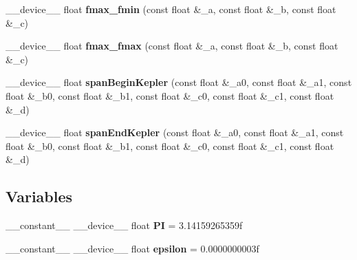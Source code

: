 \begin{DoxyCompactItemize}
\item 
\hypertarget{MathHelpers_8cuh_aaf48f2af61e0c6b973de0d961acd16b0}{\-\_\-\-\_\-device\-\_\-\-\_\- float {\bfseries fmax\-\_\-fmin} (const float \&\-\_\-a, const float \&\-\_\-b, const float \&\-\_\-c)}\label{MathHelpers_8cuh_aaf48f2af61e0c6b973de0d961acd16b0}

\item 
\hypertarget{MathHelpers_8cuh_a937b9ff47af7eb505a037fa86e1523a9}{\-\_\-\-\_\-device\-\_\-\-\_\- float {\bfseries fmax\-\_\-fmax} (const float \&\-\_\-a, const float \&\-\_\-b, const float \&\-\_\-c)}\label{MathHelpers_8cuh_a937b9ff47af7eb505a037fa86e1523a9}

\item 
\hypertarget{MathHelpers_8cuh_a17a7bff6cc0b6d64ab41e1fa53b976ee}{\-\_\-\-\_\-device\-\_\-\-\_\- float {\bfseries span\-Begin\-Kepler} (const float \&\-\_\-a0, const float \&\-\_\-a1, const float \&\-\_\-b0, const float \&\-\_\-b1, const float \&\-\_\-c0, const float \&\-\_\-c1, const float \&\-\_\-d)}\label{MathHelpers_8cuh_a17a7bff6cc0b6d64ab41e1fa53b976ee}

\item 
\hypertarget{MathHelpers_8cuh_a85b98f5676293e397b05185edbeb416e}{\-\_\-\-\_\-device\-\_\-\-\_\- float {\bfseries span\-End\-Kepler} (const float \&\-\_\-a0, const float \&\-\_\-a1, const float \&\-\_\-b0, const float \&\-\_\-b1, const float \&\-\_\-c0, const float \&\-\_\-c1, const float \&\-\_\-d)}\label{MathHelpers_8cuh_a85b98f5676293e397b05185edbeb416e}

\end{DoxyCompactItemize}
\subsection*{Variables}
\begin{DoxyCompactItemize}
\item 
\hypertarget{MathHelpers_8cuh_a6139c42f2db8c596bda238a11dbbc8d8}{\-\_\-\-\_\-constant\-\_\-\-\_\- \-\_\-\-\_\-device\-\_\-\-\_\- float {\bfseries P\-I} = 3.\-14159265359f}\label{MathHelpers_8cuh_a6139c42f2db8c596bda238a11dbbc8d8}

\item 
\hypertarget{MathHelpers_8cuh_aff7a0c4d113adf3ffba39244d3ea8c5b}{\-\_\-\-\_\-constant\-\_\-\-\_\- \-\_\-\-\_\-device\-\_\-\-\_\- float {\bfseries epsilon} = 0.\-0000000003f}\label{MathHelpers_8cuh_aff7a0c4d113adf3ffba39244d3ea8c5b}

\end{DoxyCompactItemize}


